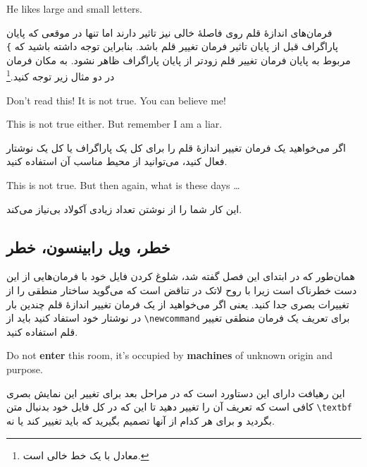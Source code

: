 \begin{example}
He likes {\LARGE large and 
{\small small} letters}. 
\end{example}
 
 
فرمان‌های اندازهٔ قلم روی فاصلهٔ خالی نیز تاثیر دارند اما تنها در موقعی که پایان پاراگراف قبل از پایان تاثیر فرمان تغییر قلم باشد. بنابراین توجه داشته باشید که  \verb|}| مربوط به پایان فرمان تغییر قلم زودتر از پایان پاراگراف ظاهر نشود. به مکان فرمان  در دو مثال زیر توجه کنید.\footnote{ معادل با یک خط خالی است.}


\begin{example}
{\Large Don't read this! 
 It is not true.
 You can believe me!\par}
\end{example}

\begin{example}
{\Large This is not true either.
But remember I am a liar.}\par
\end{example}


اگر می‌خواهید یک فرمان تغییر اندازهٔ قلم را برای کل یک پاراگراف یا کل یک نوشتار فعال کنید، می‌توانید از محیط مناسب آن استفاده کنید.


\begin{example}
\begin{Large} 
This is not true.
But then again, what is these
days \ldots
\end{Large}
\end{example}


\noindent این کار شما را از نوشتن تعداد زیادی آکولاد بی‌نیاز می‌کند.
\subsection{خطر، ویل رابینسون، خطر}
همان‌طور که در ابتدای این فصل گفته شد، شلوغ کردن فایل خود با فرمان‌هایی از این دست خطرناک است زیرا با روح لاتک در تناقض است که می‌گوید ساختار منطقی را از تغییرات بصری جدا کنید. یعنی اگر می‌خواهید از یک فرمان تغییر اندازهٔ قلم چندین بار در نوشتار خود استفاد کنید باید از 
\verb|\newcommand| برای تعریف یک فرمان منطقی تغییر قلم استفاده کنید.


\begin{example}
\newcommand{\oops}[1]{%
 \textbf{#1}}
Do not \oops{enter} this room,
it's occupied by \oops{machines}
of unknown origin and purpose.
\end{example}


این رهیافت دارای این دستاورد است که در مراحل بعد برای تغییر این نمایش بصری کافی است که تعریف آن را تغییر دهید تا این که در کل فایل خود بدنبال متن  \verb|\textbf| بگردید و برای هر کدام از آنها تصمیم بگیرید که باید تغییر کند یا نه.
